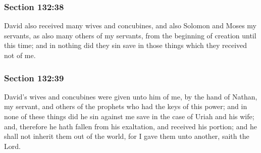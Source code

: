 
	\subsubsection{Section 132:38} %
		\label{DC132-38}

		David also received many wives and concubines, and also Solomon and Moses my servants, as also many others of my servants, from the beginning of creation until this time; and in nothing did they sin save in those things which they received not of me.


	\subsubsection{Section 132:39} %
		\label{DC132-39}

		David's wives and concubines were given unto him of me, by the hand of Nathan, my servant, and others of the prophets who had the keys of this power; and in none of these things did he sin against me save in the case of Uriah and his wife; and, therefore he hath fallen from his exaltation, and received his portion; and he shall not inherit them out of the world, for I gave them unto another, saith the Lord.


